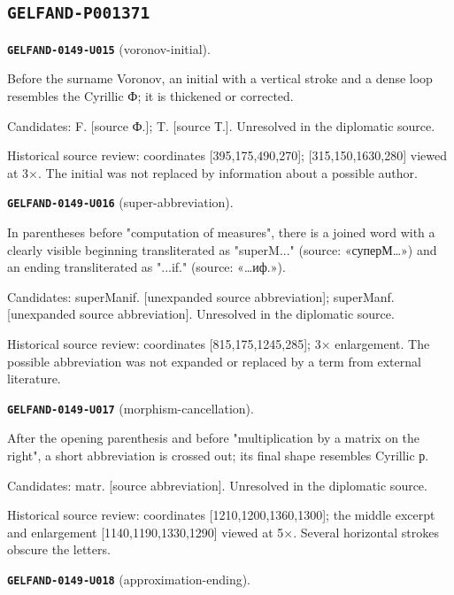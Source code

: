 \documentclass[11pt]{article}
\theoremstyle{definition}
\theoremstyle{remark}
\begin{document}
\subsection*{\texttt{GELFAND-P001371}}
\noindent\leavevmode{}\label{GELFAND-P001371:voronov-initial:note}\textbf{\texttt{GELFAND-0149-U015}} (voronov-initial).\par\nopagebreak[4]
Before the surname Voronov, an initial with a vertical stroke and a dense loop resembles the Cyrillic Ф; it is thickened or corrected.\par
Candidates: F. [source Ф.]; T. [source Т.]. Unresolved in the diplomatic source.\par
Historical source review: coordinates [395,175,490,270]; [315,150,1630,280] viewed at 3×. The initial was not replaced by information about a possible author.\par\medskip
\noindent\leavevmode{}\label{GELFAND-P001371:super-abbreviation:note}\textbf{\texttt{GELFAND-0149-U016}} (super-abbreviation).\par\nopagebreak[4]
In parentheses before "computation of measures", there is a joined word with a clearly visible beginning transliterated as "superM..." (source: «суперМ…») and an ending transliterated as "...if." (source: «…иф.»).\par
Candidates: superManif. [unexpanded source abbreviation]; superManf. [unexpanded source abbreviation]. Unresolved in the diplomatic source.\par
Historical source review: coordinates [815,175,1245,285]; 3× enlargement. The possible abbreviation was not expanded or replaced by a term from external literature.\par\medskip
\noindent\leavevmode{}\label{GELFAND-P001371:morphism-cancellation:note}\textbf{\texttt{GELFAND-0149-U017}} (morphism-cancellation).\par\nopagebreak[4]
After the opening parenthesis and before "multiplication by a matrix on the right", a short abbreviation is crossed out; its final shape resembles Cyrillic р.\par
Candidates: matr. [source abbreviation]. Unresolved in the diplomatic source.\par
Historical source review: coordinates [1210,1200,1360,1300]; the middle excerpt and enlargement [1140,1190,1330,1290] viewed at 5×. Several horizontal strokes obscure the letters.\par\medskip
\noindent\leavevmode{}\label{GELFAND-P001371:approximation-ending:note}\textbf{\texttt{GELFAND-0149-U018}} (approximation-ending).\par\nopagebreak[4]
\end{document}
